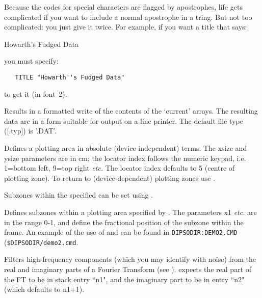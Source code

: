 \begin {description}
Because the codes for special characters are flagged by apostrophes,
life gets complicated if you want to include a normal apostrophe in a
tring. But not too complicated: you just give it twice. For example,
if you want a title that says:

\begin{center}
Howarth's Fudged Data
\end{center}

you must specify:

\begin{verbatim}
   TITLE "Howarth''s Fudged Data"
\end{verbatim}

to get it (in font~2).

Results in a formatted write of the contents of the `current' arrays.
The resulting data are in a form suitable for output on a line
printer. The default file type ([.typ]) is '.DAT'.

Defines a plotting area in absolute (device-independent) terms. The
xsize and ysize parameters are in cm; the locator index follows the
numeric keypad, i.e. 1=bottom left, 9=top right {\em etc.} The
locator index defaults to 5 (centre of plotting zone). To return to
(device-dependent) plotting zones use . 

Subzones within the specified   can be set using . 

Defines subzones within a plotting area specified by .  The
parameters x1 {\em etc.} are in the range 0-1, and define the
fractional position of the subzone within the frame. An example of the
use of   and   can be found in {\tt{DIPSODIR:DEMO2.CMD}} 
({\tt{\$DIPSODIR/demo2.cmd}}. 

Filters high-frequency components (which you may identify with noise)
from the real and imaginary parts of a Fourier Transform (see ). 
  expects the real part of the FT to be in stack entry ``n1",
and the imaginary part to be in entry ``n2" (which defaults to n1+1).


\end{description}
